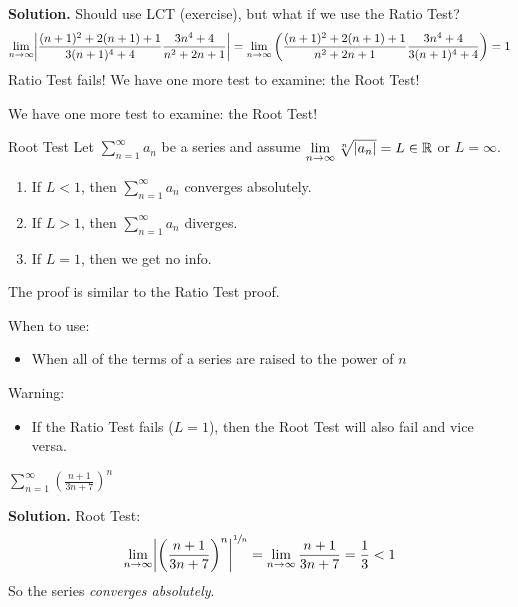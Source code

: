 \begin{Example}{}{}
\begin{enumerate}
              \textbf{Solution.} Should use LCT (exercise), but what if we use the Ratio Test?
              \[ \lim\limits_{{n} \to {\infty}} \abs*{\frac{(n+1)^2+2(n+1)+1}{3(n+1)^4+4}\frac{3n^4+4}{n^2+2n+1}}
                  =\lim\limits_{{n} \to {\infty}} \left( \frac{(n+1)^2+2(n+1)+1}{n^2+2n+1} \frac{3n^4+4}{3(n+1)^4+4}  \right)
                  =1 \]
              Ratio Test fails! We have one more test to examine: the Root Test!
    \end{enumerate}
\end{Example}

We have one more test to examine: the Root Test!

\begin{Theorem}{Root Test}{}
    Let $ \sum\limits_{n=1}^{\infty} a_n $ be a series and assume $ \lim\limits_{{n} \to {\infty}}
        \sqrt[n]{\lvert a_n\rvert}=L\in\mathbb{R} $ or $ L=\infty $.
    \begin{enumerate}
        \item If $ L<1 $, then $ \sum\limits_{n=1}^{\infty} a_n $ converges absolutely.
        \item If $ L>1 $, then $ \sum\limits_{n=1}^{\infty} a_n $ diverges.
        \item If $ L=1 $, then we get no info.
    \end{enumerate}
\end{Theorem}
The proof is similar to the Ratio Test proof.

\begin{Remark}{}{}
    When to use:
    \begin{itemize}
        \item When all of the terms of a series are raised to the power of $ n $
    \end{itemize}
    Warning:
    \begin{itemize}
        \item If the Ratio Test fails ($ L=1 $), then the Root Test will also fail
              and vice versa.
    \end{itemize}
\end{Remark}

\begin{Example}{}{}
    $ \displaystyle \sum\limits_{n=1}^{\infty}\left( \frac{n+1}{3n+7} \right)^n $

    \textbf{Solution.} Root Test:
    \[ \lim\limits_{{n} \to {\infty}} \abs*{\left( \frac{n+1}{3n+7} \right)^n}^{\sfrac{1}{n}}
        =\lim\limits_{{n} \to {\infty}} \frac{n+1}{3n+7}
        =\frac{1}{3}
        <1 \]
    So the series \emph{converges absolutely}.
\end{Example}

